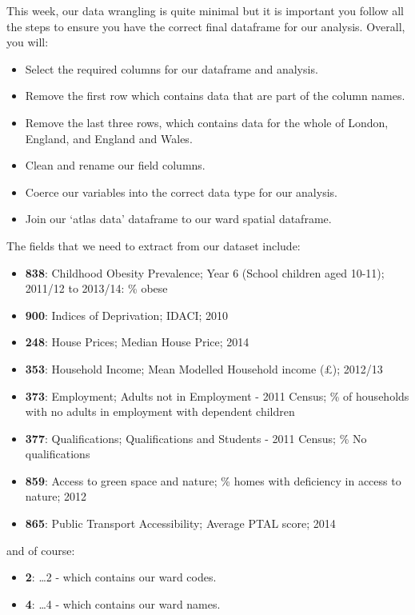 \documentclass[
]{book}
\providecommand{\tightlist}{%
  \setlength{\itemsep}{0pt}\setlength{\parskip}{0pt}}
\begin{document}
This week, our data wrangling is quite minimal but it is important you follow all the steps to ensure you have the correct final dataframe for our analysis. Overall, you will:

\begin{itemize}
\tightlist
\item
  Select the required columns for our dataframe and analysis.
\item
  Remove the first row which contains data that are part of the column names.
\item
  Remove the last three rows, which contains data for the whole of London, England, and England and Wales.
\item
  Clean and rename our field columns.
\item
  Coerce our variables into the correct data type for our analysis.
\item
  Join our `atlas data' dataframe to our ward spatial dataframe.
\end{itemize}

The fields that we need to extract from our dataset include:

\begin{itemize}
\tightlist
\item
  \textbf{838}: Childhood Obesity Prevalence; Year 6 (School children aged 10-11); 2011/12 to 2013/14: \% obese
\item
  \textbf{900}: Indices of Deprivation; IDACI; 2010
\item
  \textbf{248}: House Prices; Median House Price; 2014
\item
  \textbf{353}: Household Income; Mean Modelled Household income (£); 2012/13
\item
  \textbf{373}: Employment; Adults not in Employment - 2011 Census; \% of households with no adults in employment with dependent children
\item
  \textbf{377}: Qualifications; Qualifications and Students - 2011 Census; \% No qualifications
\item
  \textbf{859}: Access to green space and nature; \% homes with deficiency in access to nature; 2012
\item
  \textbf{865}: Public Transport Accessibility; Average PTAL score; 2014
\end{itemize}

and of course:

\begin{itemize}
\tightlist
\item
  \textbf{2}: \ldots2 - which contains our ward codes.
\item
  \textbf{4}: \ldots4 - which contains our ward names.
\end{itemize}
\end{document}
